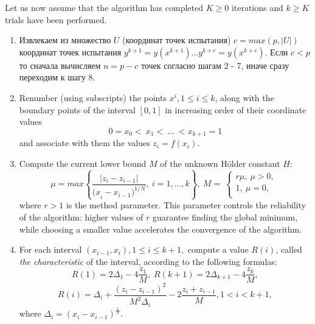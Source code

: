 \documentclass[runningheads]{llncs}
\begin{document}
Let us now assume that the algorithm has completed $K \geq 0$ iterations and $k \geq K$ trials have been performed.


\begin{enumerate}
	
	\item Извлекаем из множество $U$ (координат точек испытания) $c = max(p, |U|)$ координат точек испытания $y^{k+1}=y\left(x^{k+1}\right) ... y^{k+c}=y\left(x^{k+c}\right)$. Если $c < p$ то сначала вычисляем $n = p - c$ точек согласно шагам 2 - 7, иначе сразу переходим к шагу 8.	
	
	\item Renumber (using subscripts) the points $x^i, 1\leq i\leq k$,  along with the boundary points of the interval $[0, 1]$ in increasing order of their coordinate values
	\begin{equation} 
		\label{agp1_sort} 	0=x_0<\ x_1<\ ...\ <x_{k+1}=1 	
	\end{equation} 
	and associate with them the values $z_i=f(x_i)$. 
	
	\item  Compute the current lower bound $M$ of the unknown Hölder constant $H$: 
	\begin{equation} 
		\label{agp2_mu} 	\mu=max\left\{\frac{|z_i-z_{i-1}|}{{{(x}_i-x_{i-1})}^{1/N}},\ i=1,\ldots,k\right\},\ M=\  \left\{\begin{matrix}r\mu,\ \mu>0,\\1,\ \mu=0,\\\end{matrix}\right.\ 	
	\end{equation} 
	where $r>1$ is the method parameter. This parameter controls the reliability of the algorithm: higher values of $r$ guarantee finding the global minimum, while choosing a smaller value accelerates the convergence of the algorithm.
	
	\item  For each interval $(x_{i-1},x_i), 1\leq i\leq k+1,$ compute a value $R(i)$, called \textit{the characteristic} of the interval, according to the following formulas:
	\begin{equation} 
		\label{agp3_R1} R(1)=2\Delta_1-4\dfrac{z_1}{M}, \; R(k+1)=2\Delta_{k+1}-4\dfrac{z_k}{M}, 
	\end{equation} 
	\begin{equation} 
		\label{agp3_Ri} R(i)=\Delta_i+\dfrac{(z_i-z_{i-1})^2}{M^2\Delta_i}-2\dfrac{z_i+z_{i-1}}{M},1<i<k+1, 
	\end{equation} 
	where \(\Delta_i=(x_i-x_{i-1})^\frac{1}{N}\).
	

\end{enumerate}
\end{document}
